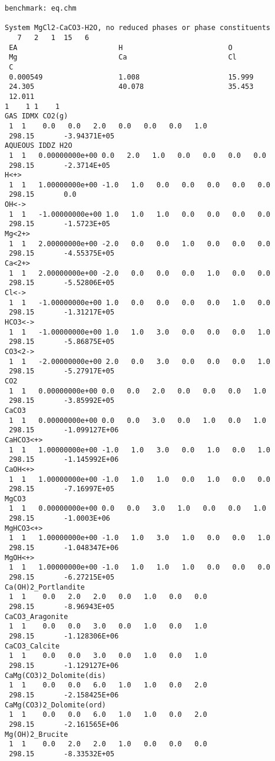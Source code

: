 \begin{verbatim}
benchmark: eq.chm

System MgCl2-CaCO3-H2O, no reduced phases or phase constituents
   7   2   1  15   6
 EA                        H                         O
 Mg                        Ca                        Cl
 C
 0.000549                  1.008                     15.999
 24.305                    40.078                    35.453
 12.011
1    1 1    1
GAS IDMX CO2(g)
 1  1    0.0   0.0   2.0   0.0   0.0   0.0   1.0
 298.15       -3.94371E+05
AQUEOUS IDDZ H2O
 1  1   0.00000000e+00 0.0   2.0   1.0   0.0   0.0   0.0   0.0
 298.15       -2.3714E+05
H<+>
 1  1   1.00000000e+00 -1.0   1.0   0.0   0.0   0.0   0.0   0.0
 298.15       0.0
OH<->
 1  1   -1.00000000e+00 1.0   1.0   1.0   0.0   0.0   0.0   0.0
 298.15       -1.5723E+05
Mg<2+>
 1  1   2.00000000e+00 -2.0   0.0   0.0   1.0   0.0   0.0   0.0
 298.15       -4.55375E+05
Ca<2+>
 1  1   2.00000000e+00 -2.0   0.0   0.0   0.0   1.0   0.0   0.0
 298.15       -5.52806E+05
Cl<->
 1  1   -1.00000000e+00 1.0   0.0   0.0   0.0   0.0   1.0   0.0
 298.15       -1.31217E+05
HCO3<->
 1  1   -1.00000000e+00 1.0   1.0   3.0   0.0   0.0   0.0   1.0
 298.15       -5.86875E+05
CO3<2->
 1  1   -2.00000000e+00 2.0   0.0   3.0   0.0   0.0   0.0   1.0
 298.15       -5.27917E+05
CO2
 1  1   0.00000000e+00 0.0   0.0   2.0   0.0   0.0   0.0   1.0
 298.15       -3.85992E+05
CaCO3
 1  1   0.00000000e+00 0.0   0.0   3.0   0.0   1.0   0.0   1.0
 298.15       -1.099127E+06
CaHCO3<+>
 1  1   1.00000000e+00 -1.0   1.0   3.0   0.0   1.0   0.0   1.0
 298.15       -1.145992E+06
CaOH<+>
 1  1   1.00000000e+00 -1.0   1.0   1.0   0.0   1.0   0.0   0.0
 298.15       -7.16997E+05
MgCO3
 1  1   0.00000000e+00 0.0   0.0   3.0   1.0   0.0   0.0   1.0
 298.15       -1.0003E+06
MgHCO3<+>
 1  1   1.00000000e+00 -1.0   1.0   3.0   1.0   0.0   0.0   1.0
 298.15       -1.048347E+06
MgOH<+>
 1  1   1.00000000e+00 -1.0   1.0   1.0   1.0   0.0   0.0   0.0
 298.15       -6.27215E+05
Ca(OH)2_Portlandite
 1  1    0.0   2.0   2.0   0.0   1.0   0.0   0.0
 298.15       -8.96943E+05
CaCO3_Aragonite
 1  1    0.0   0.0   3.0   0.0   1.0   0.0   1.0
 298.15       -1.128306E+06
CaCO3_Calcite
 1  1    0.0   0.0   3.0   0.0   1.0   0.0   1.0
 298.15       -1.129127E+06
CaMg(CO3)2_Dolomite(dis)
 1  1    0.0   0.0   6.0   1.0   1.0   0.0   2.0
 298.15       -2.158425E+06
CaMg(CO3)2_Dolomite(ord)
 1  1    0.0   0.0   6.0   1.0   1.0   0.0   2.0
 298.15       -2.161565E+06
Mg(OH)2_Brucite
 1  1    0.0   2.0   2.0   1.0   0.0   0.0   0.0
 298.15       -8.33532E+05

\end{verbatim}

